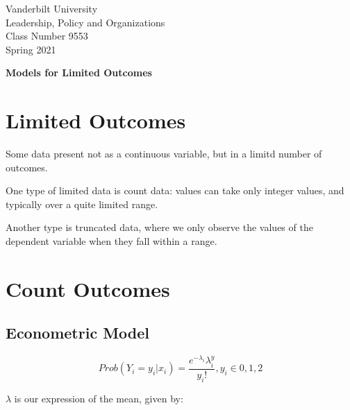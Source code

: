 \documentclass[12 pt]{article}
\begin{document}
\newcommand{\boldbeta}{\boldsymbol{\beta}}
\newcommand{\boldy}{\boldsymbol{y}}
\newcommand{\boldX}{\boldsymbol{X}}
\newcommand{\boldx}{\boldsymbol{x}}
\newcommand{\boldz}{\boldsymbol{z}}
\newcommand{\boldgamma}{\boldsymbol{\gamma}}
\newcommand{\boldeps}{\boldsymbol{\epsilon}}


\setlength{\parskip}{1ex plus 0.5ex minus 0.2ex}

\setcounter{secnumdepth}{-2}


\begin{flushleft}
  

Vanderbilt University \\
Leadership, Policy and Organizations \\
Class Number 9553 \\
Spring 2021 \\
\end{flushleft}

\begin{centering}
\textbf{\large{Models for Limited Outcomes}}  
\end{centering}


\section{Limited Outcomes}

Some data present not as a continuous variable, but in a limitd number of outcomes.

One type of limited data is count data: values can take only integer values, and typically over a quite limited range. 

Another type is truncated data, where we only observe the values of the dependent variable when they fall within a range. 

\section{Count Outcomes}

\subsection{Econometric Model}

\begin{equation}
  \label{eq:1}
  Prob(Y_i=y_i|x_i)=\frac{e^{-\lambda_i}\lambda^y_i}{y_i!}, y_i\in{0,1,2}
\end{equation}

$\lambda$ is our expression of the mean, given by:
\end{document}

